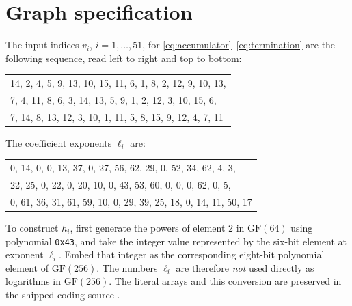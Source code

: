 \documentclass[11pt,a4paper]{article}
\newcommand{\GF}{\mathrm{GF}}
\begin{document}
\appendix
\section{Graph specification}
\label{app:graph}

The input indices $v_i$, $i=1,\ldots,51$, for
\eqref{eq:accumulator}--\eqref{eq:termination} are the following sequence,
read left to right and top to bottom:
\begin{center}\small\ttfamily
\begin{tabular}{@{}l@{}}
14, 2, 4, 5, 9, 13, 10, 15, 11, 6, 1, 8, 2, 12, 9, 10, 13,\\
7, 4, 11, 8, 6, 3, 14, 13, 5, 9, 1, 2, 12, 3, 10, 15, 6,\\
7, 14, 8, 13, 12, 3, 10, 1, 11, 5, 8, 15, 9, 12, 4, 7, 11
\end{tabular}
\end{center}
\begin{samepage}
The coefficient exponents $\ell_i$ are:
\begin{center}\small\ttfamily
\begin{tabular}{@{}l@{}}
0, 14, 0, 0, 13, 37, 0, 27, 56, 62, 29, 0, 52, 34, 62, 4, 3,\\
22, 25, 0, 22, 0, 20, 10, 0, 43, 53, 60, 0, 0, 0, 62, 0, 5,\\
0, 61, 36, 31, 61, 59, 10, 0, 29, 39, 25, 18, 0, 14, 11, 50, 17
\end{tabular}
\end{center}
\end{samepage}
To construct $h_i$, first generate the powers of element 2 in
$\GF(64)$ using polynomial \texttt{0x43}, and take the integer value
represented by the six-bit element at exponent $\ell_i$. Embed that
integer as the corresponding eight-bit polynomial element of $\GF(256)$.
The numbers $\ell_i$ are therefore \emph{not} used directly as logarithms
in $\GF(256)$. The literal arrays and this conversion are preserved in
the shipped coding source \cite{coding}.
\end{document}
